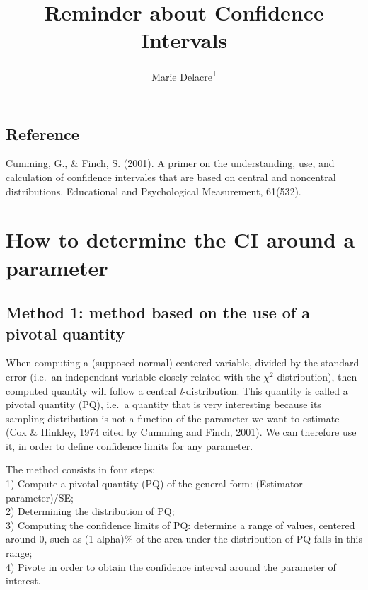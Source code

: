 \documentclass[man,floatsintext]{apa6}
\title{Reminder about Confidence Intervals}
\author{Marie Delacre\textsuperscript{1}}
\date{}
\affiliation{
\vspace{0.5cm}
\textsuperscript{1} ULB}
\begin{document}
\maketitle

\hypertarget{reference}{%
\subsection{Reference}\label{reference}}

Cumming, G., \& Finch, S. (2001). A primer on the understanding, use, and calculation of confidence intervales that are based on central and noncentral distributions. Educational and Psychological Measurement, 61(532).

\hypertarget{how-to-determine-the-ci-around-a-parameter}{%
\section{How to determine the CI around a parameter}\label{how-to-determine-the-ci-around-a-parameter}}

\hypertarget{method-1-method-based-on-the-use-of-a-pivotal-quantity}{%
\subsection{Method 1: method based on the use of a pivotal quantity}\label{method-1-method-based-on-the-use-of-a-pivotal-quantity}}

When computing a (supposed normal) centered variable, divided by the standard error (i.e.~an independant variable closely related with the \(\chi^2\) distribution), then computed quantity will follow a central \emph{t}-distribution. This quantity is called a pivotal quantity (PQ), i.e.~a quantity that is very interesting because its sampling distribution is not a function of the parameter we want to estimate (Cox \& Hinkley, 1974 cited by Cumming and Finch, 2001). We can therefore use it, in order to define confidence limits for any parameter.

The method consists in four steps:\\
1) Compute a pivotal quantity (PQ) of the general form: (Estimator - parameter)/SE;\\
2) Determining the distribution of PQ;\\
3) Computing the confidence limits of PQ: determine a range of values, centered around 0, such as (1-alpha)\% of the area under the distribution of PQ falls in this range;\\
4) Pivote in order to obtain the confidence interval around the parameter of interest.
\end{document}
